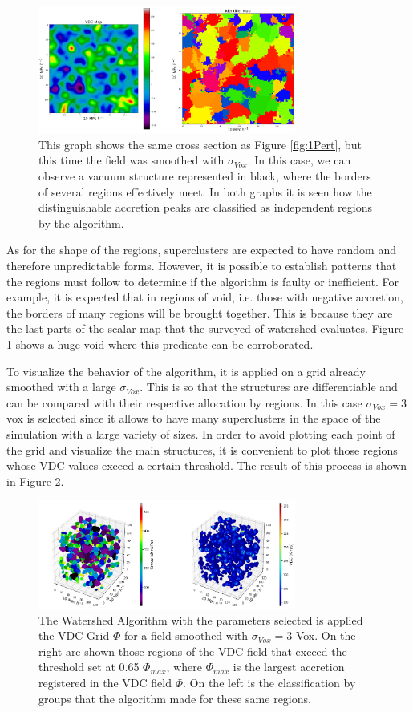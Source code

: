 \documentclass[a4paper,fleqn,usenatbib]{mnras}
\begin{document}
\begin{figure}
    \centering
    \includegraphics[width=240pt]{3PlotPert_48.png}
    \caption{This graph shows the same cross section as Figure \ref{fig:1Pert}, but this time the field was smoothed with $\sigma_{Vox}$. In this case, we can observe a vacuum structure represented in black, where the borders of several regions effectively meet. In both graphs it is seen how the distinguishable accretion peaks are classified as independent regions by the algorithm.}
    \label{fig:3Pert}
\end{figure}
As for the shape of the regions, superclusters are expected to have random and therefore unpredictable forms. However, it is possible to establish patterns that the regions must follow to determine if the algorithm is faulty or inefficient. For example, it is expected that in regions of void, i.e. those with negative accretion, the borders of many regions will be brought together. This is because they are the last parts of the scalar map that the surveyed of watershed evaluates. Figure \ref{fig:3Pert} shows a huge void where this predicate can be corroborated.


To visualize the behavior of the algorithm, it is applied on a grid already smoothed with a large $\sigma_{Vox}$. This is so that the structures are differentiable and can be compared with their respective allocation by regions. In this case $\sigma_{Vox} = 3$ vox is selected since it allows to have many superclusters in the space of the simulation with a large variety of sizes. In order to avoid plotting each point of the grid and visualize the main structures, it is convenient to plot those regions whose VDC values exceed a certain threshold. The result of this process is shown in Figure \ref{fig:3STRUCTURES}.
\begin{figure}
    \centering
    \includegraphics[width=240pt]{N65SegmentationSigmas137.png}
    \caption{The Watershed Algorithm with the parameters selected is applied the VDC Grid $\Phi$ for a field smoothed with $\sigma_{Vox} = 3$ Vox. On the right are shown those regions of the VDC field that exceed the threshold set at 0.65 $\Phi_{max}$, where $\Phi_{max}$ is the largest accretion registered in the VDC field $\Phi$. On the left is the classification by groups that the algorithm made for these same regions.}
    \label{fig:3STRUCTURES}
\end{figure}
\end{document}

